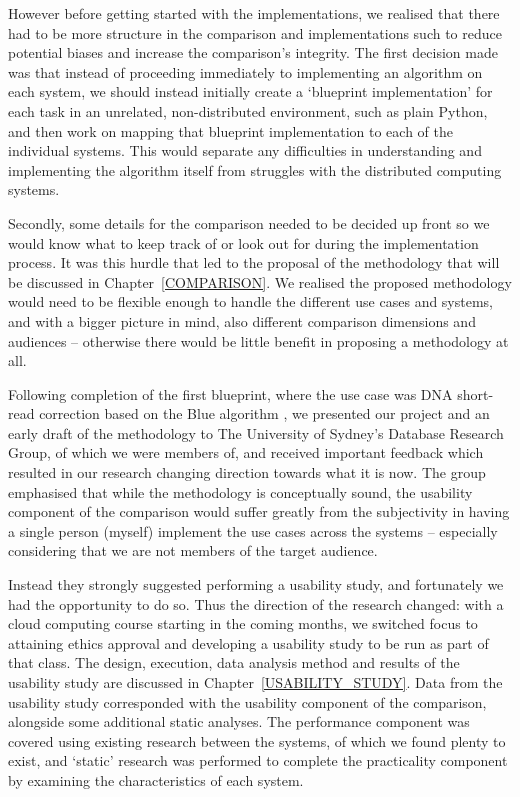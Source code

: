   However before getting started with the implementations, we realised that there had to be more structure in the comparison and implementations such to reduce potential biases and increase the comparison's integrity. The first decision made was that instead of proceeding immediately to implementing an algorithm on each system, we should instead initially create a `blueprint implementation' for each task in an unrelated, non-distributed environment, such as plain Python, and then work on mapping that blueprint implementation to each of the individual systems. This would separate any difficulties in understanding and implementing the algorithm itself from struggles with the distributed computing systems.
  
  Secondly, some details for the comparison needed to be decided up front so we would know what to keep track of or look out for during the implementation process. It was this hurdle that led to the proposal of the methodology that will be discussed in Chapter~\ref{COMPARISON}. We realised the proposed methodology would need to be flexible enough to handle the different use cases and systems, and with a bigger picture in mind, also different comparison dimensions and audiences -- otherwise there would be little benefit in proposing a methodology at all.

  Following completion of the first blueprint, where the use case was DNA short-read correction based on the Blue algorithm \cite{GREENFIELD:BLUE:2014}, we presented our project and an early draft of the methodology to The University of Sydney's Database Research Group, of which we were members of, and received important feedback which resulted in our research changing direction towards what it is now. The group emphasised that while the methodology is conceptually sound, the usability component of the comparison would suffer greatly from the subjectivity in having a single person (myself) implement the use cases across the systems -- especially considering that we are not members of the target audience.
  
  Instead they strongly suggested performing a usability study, and fortunately we had the opportunity to do so. Thus the direction of the research changed: with a cloud computing course starting in the coming months, we switched focus to attaining ethics approval and developing a usability study to be run as part of that class. The design, execution, data analysis method and results of the usability study are discussed in Chapter~\ref{USABILITY_STUDY}. Data from the usability study corresponded with the usability component of the comparison, alongside some additional static analyses. The performance component was covered using existing research between the systems, of which we found plenty to exist, and `static' research was performed to complete the practicality component by examining the characteristics of each system.
  
